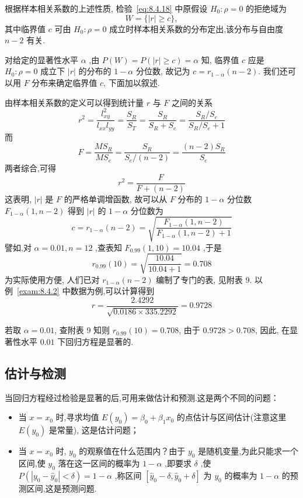 根据样本相关系数的上述性质, 检验~\eqref{eq:8.4.18} 中原假设 $H_0: \rho=0$ 的拒绝域为
\begin{equation*}
  W = \{|r| \geq c\},
\end{equation*}
其中临界值 $c$ 可由 $H_0:\rho =0$ 成立时样本相关系数的分布定出,该分布与自由度 $n-2$ 有关.

对给定的显著性水平 $\alpha$ ,由 $P(W)=P(|r|\ge c)=\alpha$ 知, 临界值 $c$ 应是 $H_0:\rho =0$ 成立下 $|r|$ 的分布的 $1-\alpha$ 分位数, 故记为 $c = r_{1-\alpha}(n-2)$. 我们还可以用 $F$ 分布来确定临界值 $c$, 下面加以叙述.

由样本相关系数的定义可以得到统计量 $r$ 与 $F$ 之间的关系
\begin{equation*}
r^{2} =\frac{l_{x y}^{2}}{l_{x x} l_{y y}}=\frac{S_{R}}{S_{T}}=\frac{S_{R}}{S_{R}+S_{e}}=\frac{S_{R} / S_{e}}{S_{R} / S_{e}+1}
\end{equation*}
而
\begin{equation*}
F=\frac{MS_R}{MS_e}=\frac{S_R}{S_e/\left( n-2 \right)}=\frac{\left( n-2 \right) S_R}{S_e}
\end{equation*}
两者综合,可得
\begin{equation*}
r^2=\frac{F}{F+(n-2)}
\end{equation*}
这表明, $|r|$ 是 $F$ 的严格单调增函数, 故可以从 $F$ 分布的 $1-\alpha$ 分位数 $F_{1-\alpha}(1,n-2)$ 得到 $|r|$ 的 $1-\alpha$ 分位数为
\begin{equation*}
c=r_{1-\alpha}(n-2)=\sqrt{\frac{F_{1-\alpha}(1, n-2)}{F_{1-\alpha}(1, n-2)+1}}
\end{equation*}
譬如,对 $\alpha =0.01,n=12$ ,查表知 $F_{0.99}(1,10)=10.04$ ,于是
\begin{equation*}
r_{0.99}(10)=\sqrt{\frac{10.04}{10.04+1}}=0.708
\end{equation*}
为实际使用方便, 人们已对 $r_{1-\alpha}(n-2)$ 编制了专门的表, 见附表 9.
以例~\ref{exam:8.4.2} 中数据为例,可以计算得到
\begin{equation*}
r=\frac{2.4292}{\sqrt{0.0186 \times 335.2292}}=0.9728
\end{equation*}

若取 $\alpha =0.01$, 查附表 9 知则 $r_{0.99}(10)=0.708$, 由于 $0.9728>0.708$, 因此, 在显著性水平 $0.01$ 下回归方程是显著的.


\subsection{估计与检测}\label{sec:8.4.5}

当回归方程经过检验是显著的后,可用来做估计和预测.这是两个不同的问题：
\begin{itemize}
    \item 当 $x=x_0$ 时,寻求均值 $E(y_0)=\beta_0+\beta_1 x_0$ 的点估计与区间估计(注意这里 $E(y_0)$ 是常量), 这是估计问题；
    \item 当 $x=x_0$ 时, $y_0$ 的观察值在什么范围内？由于 $y_0$ 是随机变量,为此只能求一个区间,使 $y_0$ 落在这一区间的概率为 $1-\alpha$ ,即要求 $\delta$ ,使 $P(|y_0-\hat{y}_0|<\delta)=1-\alpha$ ,称区间 $\left[\hat{y}_{0}-\delta, \hat{y}_{0}+\delta\right]$ 为 $y_0$ 的概率为 $1-\alpha$ 的预测区间,这是预测问题.
\end{itemize}

